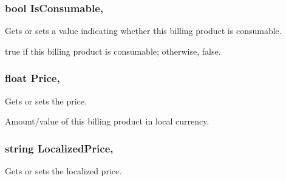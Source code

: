 \subsubsection[{Is\+Consumable}]{\setlength{\rightskip}{0pt plus 5cm}bool Is\+Consumable\hspace{0.3cm}{\ttfamily [get]}, {\ttfamily [set]}}\label{class_voxel_busters_1_1_native_plugins_1_1_billing_product_a53a97d6cef9b971855e7ac9fe437fec9}


Gets or sets a value indicating whether this billing product is consumable. 

{\ttfamily true} if this billing product is consumable; otherwise, {\ttfamily false}.\hypertarget{class_voxel_busters_1_1_native_plugins_1_1_billing_product_af97474bf51c3b45301f3e01271baef3b}{}
\subsubsection[{Price}]{\setlength{\rightskip}{0pt plus 5cm}float Price\hspace{0.3cm}{\ttfamily [get]}, {\ttfamily [set]}}\label{class_voxel_busters_1_1_native_plugins_1_1_billing_product_af97474bf51c3b45301f3e01271baef3b}


Gets or sets the price. 

Amount/value of this billing product in local currency.\hypertarget{class_voxel_busters_1_1_native_plugins_1_1_billing_product_a244402a53e71855c3657ff810ec10ce2}{}
\subsubsection[{Localized\+Price}]{\setlength{\rightskip}{0pt plus 5cm}string Localized\+Price\hspace{0.3cm}{\ttfamily [get]}, {\ttfamily [set]}}\label{class_voxel_busters_1_1_native_plugins_1_1_billing_product_a244402a53e71855c3657ff810ec10ce2}


Gets or sets the localized price. 


